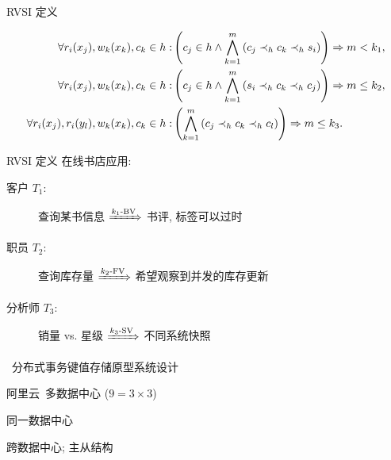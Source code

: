\begin{frame}{RVSI 定义}
  \begin{cdef}
	{\footnotesize
	\begin{align*}
	  \forall r_i(x_{j}), w_k(x_k), c_k \in h: & \left(c_j \in h \land \bigwedge_{k=1}^{m} \left(c_j \prec_{h}{} c_k \prec_{h}{} s_i \right)\right) \Rightarrow m < k_1, \\
	  \forall r_i(x_{j}), w_k(x_k), c_k \in h: & \left(c_j \in h \land \bigwedge_{k=1}^{m} \left(s_i \prec_{h}{} c_k \prec_{h}{} c_j \right)\right) \Rightarrow m \le k_2, \\
	  \forall r_i(x_j), r_i(y_l), w_k(x_k), c_k \in h: & \left(\bigwedge_{k=1}^{m} \left(c_j \prec_{h}{} c_k \prec_{h}{} c_l \right)\right) \Rightarrow m \le k_3.
	\end{align*}
  }
  \end{cdef}
\end{frame}
\begin{frame}{RVSI 定义}
  在线书店应用:
  \begin{description}
	\item[客户 $T_1$:] 查询某书信息 \textcolor{brown}{$\xRightarrow{k_1\text{-BV}}$} 书评, 标签可以过时
	\item[职员 $T_2$:] 查询库存量 \textcolor{brown}{$\xRightarrow{k_2\text{-FV}}$} 希望观察到并发的库存更新
	\item[分析师 $T_3$:] 销量 vs. 星级 \textcolor{brown}{$\xRightarrow{k_3\text{-SV}}$} 不同系统快照
  \end{description}
\end{frame}
\begin{frame}{\chameleon{}~\footnotemark[1]分布式事务键值存储原型系统设计}
  \begin{description}
	\item[系统架构:] 阿里云~\footnotemark[2]多数据中心 {\small ($9 = 3 \times 3$)} %
	\item<2->[数据分区:] 同一数据中心
	\item<2->[数据副本:] 跨数据中心; 主从结构
  \end{description}


\end{frame}
